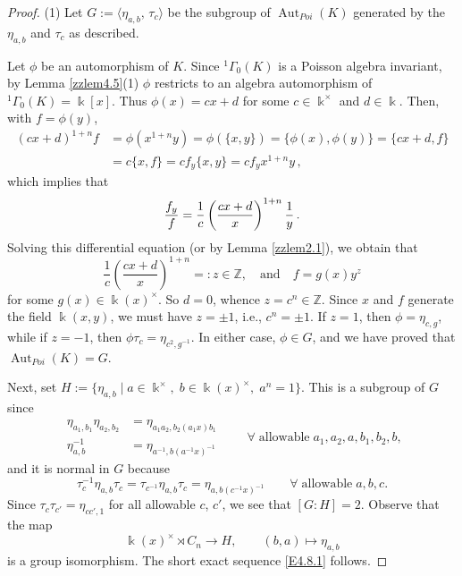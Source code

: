 \documentclass[12pt]{amsart}
\theoremstyle{plain}
\numberwithin{theorem}{section}
\numberwithin{equation}{theorem}
\theoremstyle{definition}
\newcommand{\ZZ}{\mathbb{Z}}
\DeclareMathOperator{\Aut}{Aut}
\newcommand \kx {\Bbbk^\times}
\begin{document}
\begin{proof}
(1) Let $G := \langle \eta_{a,b},\, \tau_c \rangle$ be the subgroup of $\Aut_{Poi}(K)$ generated by the $\eta_{a,b}$ and $\tau_c$ as described.

Let $\phi$
be an automorphism of $K$. Since ${^1\Gamma}_{0}(K)$
is a Poisson algebra invariant, by Lemma \ref{zzlem4.5}(1)
$\phi$ restricts to an algebra automorphism of 
${^1\Gamma}_{0}(K)=\Bbbk[x]$. Thus $\phi(x)=c x+d$
for some $c\in \Bbbk^{\times}$ and $d\in \Bbbk$. 
Then, with $f=\phi(y)$,
$$\begin{aligned}
(cx+d)^{1+n} f&=\phi(x^{1+n}y)=\phi(\{x,y\}) =\{\phi(x),\phi(y)\}=\{cx+d, f\}\\
&=c\{x,f\}=cf_{y} \{x,y\} =cf_{y} x^{1+n} y \,,
\end{aligned}
$$
which implies that
\begin{equation}
\notag
\frac{f_{y}}{f} = \frac{1}{c}
\left(\frac{cx+d}{x}\right)^{1+n} \frac{1}{y} \,.
\end{equation}
Solving this differential equation (or by Lemma \ref{zzlem2.1}), we 
obtain that
$$\frac{1}{c} \left(\frac{cx+d}{x}\right)^{1+n} =: z\in {\ZZ},
\quad {\text{and}} \quad f=g(x) y^{z}$$
 for some 
$g(x)\in \Bbbk(x)^{\times}$.
So $d=0$, whence $z=c^n\in {\ZZ}$. Since $x$ and $f$ generate the field
$\Bbbk(x,y)$, we must have $z= \pm 1$, i.e., $c^n= \pm 1$. 
If $z=1$, then $\phi = \eta_{c,g}$, while if $z = -1$, then $\phi \tau_c = \eta_{c^2,g^{-1}}$.  In either case, $\phi \in G$, and we have proved that $\Aut_{Poi}(K) = G$.

Next, set $H := \{ \eta_{a,b}  \mid a \in \kx,\; b\in 
\Bbbk(x)^{\times},\; a^n=1 \}$.  This is a subgroup of $G$ since
\begin{equation*}
\begin{aligned}
\eta_{a_1,b_1} \eta_{a_2,b_2} &= \eta_{a_1a_2, b_2(a_1x) b_1}  \\
\eta_{a,b}^{-1} &= \eta_{a^{-1}, b(a^{-1}x)^{-1}}
\end{aligned}
\qquad \forall\; \text{allowable}\; a_1,a_2,a,b_1,b_2,b,
\end{equation*}
 and it is normal in $G$ because
 \begin{equation}  \label{E4.8.2}  \tag{E4.8.2}
\tau_c^{-1} \eta_{a,b} \tau_c = \tau_{c^{-1}} \eta_{a,b} \tau_c = \eta_{a,b(c^{-1}x)^{-1}} \qquad \forall\; \text{allowable}\; a,b,c.
\end{equation}
Since $\tau_c \tau_{c'} = \eta_{cc',1}$ for all allowable $c$, $c'$, we see that $[G:H] = 2$.  Observe that the map
$$
\Bbbk(x)^\times \rtimes C_n \rightarrow H, \qquad (b,a) \mapsto \eta_{a,b}
$$
is a group isomorphism. The short exact sequence \eqref{E4.8.1} follows.


\end{proof}
\end{document}
